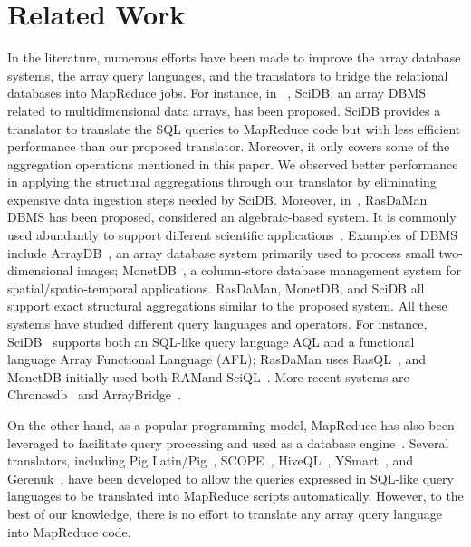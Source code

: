 \section{Related Work}
\label{related}

In the literature, numerous efforts have been made to improve the array database systems, the array query languages, and the translators to bridge the relational databases into MapReduce jobs. For instance, in ~\cite{Brown10}, SciDB, an array DBMS related to multidimensional data arrays, has been proposed. SciDB provides a translator to translate the SQL queries to MapReduce code but with less efficient performance than our proposed translator. Moreover, it only covers some of the aggregation operations mentioned in this paper. We observed better performance in applying the structural aggregations through our translator by eliminating expensive data ingestion steps needed by SciDB.
Moreover, in~\cite{Baumann98}, RasDaMan DBMS has been proposed, considered an algebraic-based system. It is commonly used abundantly to support different scientific applications~\cite{Baumann99}. Examples of DBMS include ArrayDB~\cite{marathe2002query}, an array database system primarily used to process small two-dimensional images; MonetDB~\cite{MonetDB}, a column-store database management system for spatial/spatio-temporal applications. RasDaMan, MonetDB, and SciDB all support exact structural aggregations similar to the proposed system. All these systems have studied different query languages and operators. For instance, SciDB~\cite{Brown10} supports both an SQL-like query language AQL and a functional language Array Functional Language (AFL); RasDaMan uses RasQL~\cite{Baumann98}, and MonetDB initially used both RAMand SciQL~\cite{IDEAS11}. More recent systems are Chronosdb~\cite{zalipynis2018chronosdb} and ArrayBridge~\cite{xing2018arraybridge}.

On the other hand, as a popular programming model, MapReduce has also been leveraged to facilitate query processing and used as a database engine~\cite{thusoo2009hive,lee2011ysmart, pang2021aqua+}. Several translators, including Pig Latin/Pig~\cite{olston2008pig}, SCOPE~\cite{chaiken2008scope}, HiveQL~\cite{thusoo2009hive}, YSmart~\cite{lee2011ysmart}, and Gerenuk~\cite{navasca2019gerenuk}, have been developed to allow the queries expressed in SQL-like query languages to be translated into MapReduce scripts automatically. However, to the best of our knowledge, there is no effort to translate any array query language into MapReduce code.